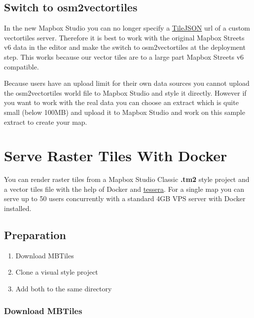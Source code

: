 \subsection{Switch to osm2vectortiles}\label{switch-to-osm2vectortiles}

In the new Mapbox Studio you can no longer specify a
\href{https://github.com/mapbox/tilejson-spec}{TileJSON} url of a custom
vectortiles server. Therefore it is best to work with the original
Mapbox Streets v6 data in the editor and make the switch to
osm2vectortiles at the deployment step. This works because our vector
tiles are to a large part Mapbox Streets v6 compatible.

Because users have an upload limit for their own data sources you cannot
upload the osm2vectortiles world file to Mapbox Studio and style it
directly. However if you want to work with the real data you can choose
an extract which is quite small (below 100MB) and upload it to Mapbox
Studio and work on this sample extract to create your map.

\section{Serve Raster Tiles With Docker}

You can render raster tiles from a Mapbox Studio Classic \textbf{.tm2}
style project and a vector tiles file with the help of Docker and
\href{https://github.com/mojodna/tessera}{tessera}. For a single map you
can serve up to 50 users concurrently with a standard 4GB VPS server
with Docker installed.

\subsection{Preparation}\label{preparation}

\begin{enumerate}
\item
  Download MBTiles
\item
  Clone a visual style project
\item
  Add both to the same directory
\end{enumerate}

\subsubsection{Download MBTiles}\label{download-mbtiles}


